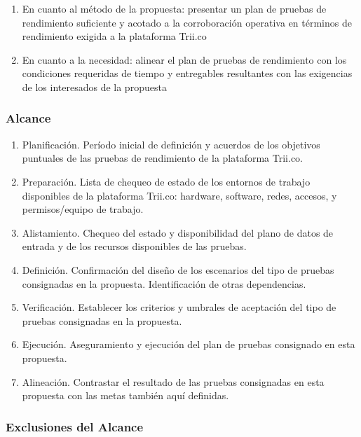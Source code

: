\documentclass[
  paper=a4,
  ,captions=tableheading
]{scrartcl}
\providecommand{\tightlist}{%
  \setlength{\itemsep}{0pt}\setlength{\parskip}{0pt}}
\begin{document}
\begin{enumerate}
\def\labelenumi{\arabic{enumi}.}
\tightlist
\item
  En cuanto al método de la propuesta: presentar un plan de pruebas de
  rendimiento suficiente y acotado a la corroboración operativa en
  términos de rendimiento exigida a la plataforma Trii.co
\item
  En cuanto a la necesidad: alinear el plan de pruebas de rendimiento
  con los condiciones requeridas de tiempo y entregables resultantes con
  las exigencias de los interesados de la propuesta
\end{enumerate}

\subsubsection{Alcance}\label{sec:alcance}

\begin{enumerate}
\def\labelenumi{\arabic{enumi}.}
\tightlist
\item
  Planificación. Período inicial de definición y acuerdos de los
  objetivos puntuales de las pruebas de rendimiento de la plataforma
  Trii.co.
\item
  Preparación. Lista de chequeo de estado de los entornos de trabajo
  disponibles de la plataforma Trii.co: hardware, software, redes,
  accesos, y permisos/equipo de trabajo.
\item
  Alistamiento. Chequeo del estado y disponibilidad del plano de datos
  de entrada y de los recursos disponibles de las pruebas.
\item
  Definición. Confirmación del diseño de los escenarios del tipo de
  pruebas consignadas en la propuesta. Identificación de otras
  dependencias.
\item
  Verificación. Establecer los criterios y umbrales de aceptación del
  tipo de pruebas consignadas en la propuesta.
\item
  Ejecución. Aseguramiento y ejecución del plan de pruebas consignado en
  esta propuesta.
\item
  Alineación. Contrastar el resultado de las pruebas consignadas en esta
  propuesta con las metas también aquí definidas.
\end{enumerate}

\subsubsection{Exclusiones del
Alcance}\label{sec:exclusiones-del-alcance}
\end{document}
